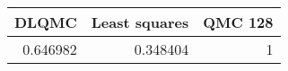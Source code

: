 \begin{tabular}{rrr}
\toprule
    DLQMC &   Least squares &   QMC 128 \\
\midrule
 0.646982 &        0.348404 &         1 \\
\bottomrule
\end{tabular}
